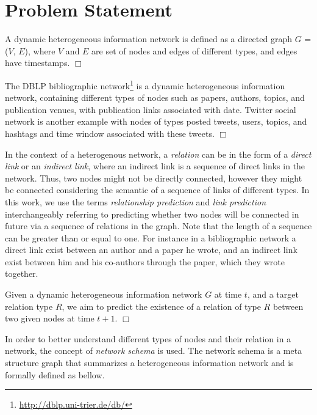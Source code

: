 \section{Problem Statement}

\begin{definition}
A dynamic heterogeneous information network is defined as a directed graph $G$ = ($V$, $E$), where $V$ and $E$ are set of nodes and edges of different types, and edges have timestamps. $\Box$ 
\end{definition}

\begin{example}
The DBLP bibliographic network\footnote{\url{http://dblp.uni-trier.de/db/}} is a dynamic heterogeneous information network, containing different types of nodes such as papers, authors, topics, and publication venues, with publication links associated with date. Twitter social network is another example with nodes of types posted tweets, users, topics, and hashtags and time window associated with these tweets. $\Box$
\end{example}

In the context of a heterogenous network, a \textit{relation} can be in the form of a \textit{direct link} or an \textit{indirect link}, where an indirect link is a sequence of direct links in the network. Thus, two nodes might not be directly connected, however they might be connected considering the semantic of a sequence of links of different types. In this work, we use the terms \textit{relationship prediction} and \textit{link prediction} interchangeably referring to predicting whether two nodes will be connected in future via a sequence of relations in the graph. Note that the length of a sequence can be greater than or equal to one. For instance in a bibliographic network a direct link exist between an author and a paper he wrote, and an indirect link exist between him and his co-authors through the paper, which they wrote together.

\begin{definition}\label{problemdef}
Given a dynamic heterogeneous information network $G$ at time $t$, and a target relation type $R$, we aim to predict the existence of a relation of type $R$ between two given nodes at time $t+1$. $\Box$
 \end{definition}

In order to better understand different types of nodes and their relation in a network, the concept of \textit{network schema} \cite{sun2011pathsim} is used. The network schema is a meta structure graph that summarizes a heterogeneous information network and is formally defined as bellow.

